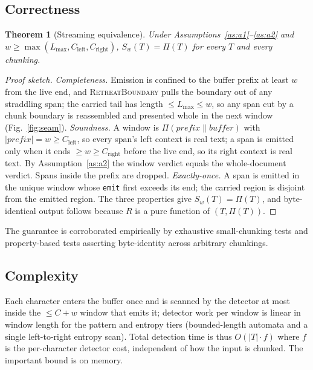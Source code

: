 \documentclass[conference]{IEEEtran}
\newtheorem{theorem}{Theorem}
\begin{document}
\subsection{Correctness}

\begin{theorem}[Streaming equivalence]\label{thm:stream}
Under Assumptions~\ref{as:a1}--\ref{as:a2} and
$w\ge\max(L_{\max},C_{\mathrm{left}},C_{\mathrm{right}})$, $S_w(T)=\Pi(T)$ for
every $T$ and every chunking.
\end{theorem}

\begin{proof}[Proof sketch]
\emph{Completeness.} Emission is confined to the buffer prefix at least $w$ from
the live end, and \textsc{RetreatBoundary} pulls the boundary out of any
straddling span; the carried tail has length $\le L_{\max}\le w$, so any span cut
by a chunk boundary is reassembled and presented whole in the next window
(Fig.~\ref{fig:seam}).
\emph{Soundness.} A window is $\Pi(\textit{prefix}\|\textit{buffer})$ with
$|\textit{prefix}|=w\ge C_{\mathrm{left}}$, so every span's left context is real
text; a span is emitted only when it ends $\ge w\ge C_{\mathrm{right}}$ before the
live end, so its right context is real text. By Assumption~\ref{as:a2} the
window verdict equals the whole-document verdict. Spans inside the prefix are
dropped.
\emph{Exactly-once.} A span is emitted in the unique window whose \texttt{emit}
first exceeds its end; the carried region is disjoint from the emitted region.
The three properties give $S_w(T)=\Pi(T)$, and byte-identical output follows
because $R$ is a pure function of $(T,\Pi(T))$.
\end{proof}

The guarantee is corroborated empirically by exhaustive small-chunking tests and
property-based tests asserting byte-identity across arbitrary chunkings.

\subsection{Complexity}\label{sec:complexity}

Each character enters the buffer once and is scanned by the detector at most
inside the $\le C+w$ window that emits it; detector work per window is linear in
window length for the pattern and entropy tiers (bounded-length automata and a
single left-to-right entropy scan). Total detection time is thus
$O(|T|\cdot f)$ where $f$ is the per-character detector cost, independent of how
the input is chunked. The important bound is on memory.
\end{document}
